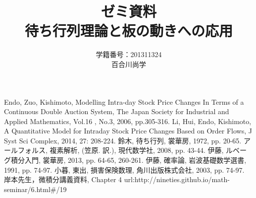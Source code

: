 \documentclass[a4j,papersize,disablejfam,slide,14pt]{jsarticle}
\begin{document}
\title{\Huge ゼミ資料\\待ち行列理論と板の動きへの応用}
\author{\Large 学籍番号：201311324\\百合川尚学}
\maketitle

\tableofcontents

\begin{thebibliography}{9}
         {\rm Endo, Zuo, Kishimoto, 
        Modelling Intra-day Stock Price Changes In Terms of
        a Continuous Double Auction System, 
        The Japan Society for Industrial and Applied Mathematics, 
        Vol.16 , No.3, 2006, pp.305-316.}
         {\rm Li, Hui, Endo, Kishimoto, A Quantitative Model for Intraday Stock Price
         Changes Based on Order Flows, 
         J Syst Sci Complex, 2014, 27: 208-224.}
         {\rm 鈴木, 待ち行列, 裳華房, 1972, pp. 20-65.}
         {\rm アールフォルス, 複素解析, (笠原. 訳.), 現代数学社, 2008, pp. 43-44.}
         {\rm 伊藤, ルベーグ積分入門, 裳華房, 2013, pp. 64-65, 260-261.}
         {\rm 伊藤, 確率論, 岩波基礎数学選書, 1991, pp. 74-97.}
         {\rm 小暮, 東出, 損害保険数理, 角川出版株式会社, 2003, pp. 74-97.}
         {\rm 岸本先生，微積分講義資料, Chapter 4}
         {\rm url:http://nineties.github.io/math-seminar/6.html#/19}
\end{thebibliography}
\end{document}
